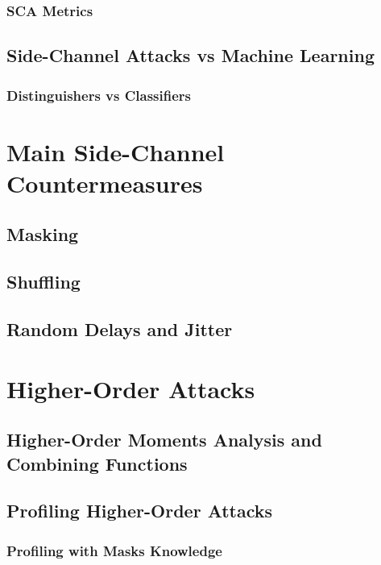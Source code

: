 \subsubsection{SCA Metrics}

\subsection{Side-Channel Attacks vs Machine Learning}
\subsubsection{Distinguishers vs Classifiers}


\section{Main Side-Channel Countermeasures}
\subsection{Masking}
\subsection{Shuffling}
\subsection{Random Delays and Jitter}


\section{Higher-Order Attacks}
\subsection{Higher-Order Moments Analysis and Combining Functions}
\subsection{Profiling Higher-Order Attacks}
\subsubsection{Profiling with Masks Knowledge}
